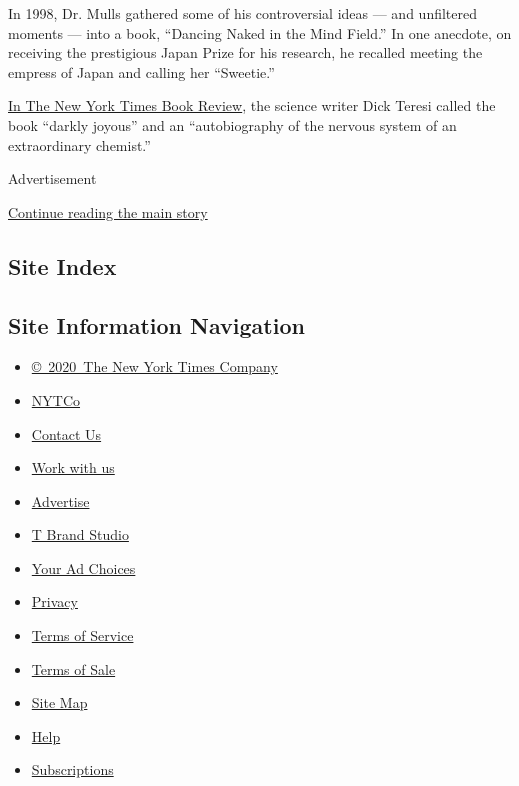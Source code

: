 In 1998, Dr. Mulls gathered some of his controversial ideas --- and
unfiltered moments --- into a book, ``Dancing Naked in the Mind Field.''
In one anecdote, on receiving the prestigious Japan Prize for his
research, he recalled meeting the empress of Japan and calling her
``Sweetie.''

\href{https://www.nytimes3xbfgragh.onion/1998/10/11/books/weird-science.html}{In
The New York Times Book Review}, the science writer Dick Teresi called
the book ``darkly joyous'' and an ``autobiography of the nervous system
of an extraordinary chemist.''

Advertisement

\protect\hyperlink{after-bottom}{Continue reading the main story}

\hypertarget{site-index}{%
\subsection{Site Index}\label{site-index}}

\hypertarget{site-information-navigation}{%
\subsection{Site Information
Navigation}\label{site-information-navigation}}

\begin{itemize}
\tightlist
\item
  \href{https://help.nytimes3xbfgragh.onion/hc/en-us/articles/115014792127-Copyright-notice}{©~2020~The
  New York Times Company}
\end{itemize}

\begin{itemize}
\tightlist
\item
  \href{https://www.nytco.com/}{NYTCo}
\item
  \href{https://help.nytimes3xbfgragh.onion/hc/en-us/articles/115015385887-Contact-Us}{Contact
  Us}
\item
  \href{https://www.nytco.com/careers/}{Work with us}
\item
  \href{https://nytmediakit.com/}{Advertise}
\item
  \href{http://www.tbrandstudio.com/}{T Brand Studio}
\item
  \href{https://www.nytimes3xbfgragh.onion/privacy/cookie-policy\#how-do-i-manage-trackers}{Your
  Ad Choices}
\item
  \href{https://www.nytimes3xbfgragh.onion/privacy}{Privacy}
\item
  \href{https://help.nytimes3xbfgragh.onion/hc/en-us/articles/115014893428-Terms-of-service}{Terms
  of Service}
\item
  \href{https://help.nytimes3xbfgragh.onion/hc/en-us/articles/115014893968-Terms-of-sale}{Terms
  of Sale}
\item
  \href{https://spiderbites.nytimes3xbfgragh.onion}{Site Map}
\item
  \href{https://help.nytimes3xbfgragh.onion/hc/en-us}{Help}
\item
  \href{https://www.nytimes3xbfgragh.onion/subscription?campaignId=37WXW}{Subscriptions}
\end{itemize}
